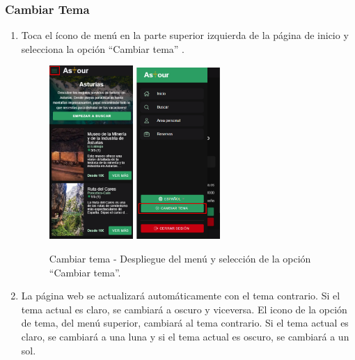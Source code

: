 \subsubsection{Cambiar Tema}
\begin{enumerate}
	\item Toca el ícono de menú en la parte superior izquierda de la página de inicio y selecciona la opción “Cambiar tema” .
	      \begin{figure}[H]
		      \centering
		      \includegraphics[width=0.3\textwidth]{7-Construccion/Manuales/mobile/menu marcado.png}
		      \includegraphics[width=0.3\textwidth]{7-Construccion/Manuales/mobile/tema marcado.png}
		      \caption{Cambiar tema - Despliegue del menú y selección de la opción “Cambiar tema”.}
	      \end{figure}
	\item La página web se actualizará automáticamente con el tema contrario. Si el tema actual es claro, se cambiará a oscuro y viceversa.
	      El icono de la opción de tema, del menú superior, cambiará al tema contrario. Si el tema actual es claro, se cambiará a una luna y si el tema actual es oscuro, se cambiará a un sol.

\end{enumerate}
